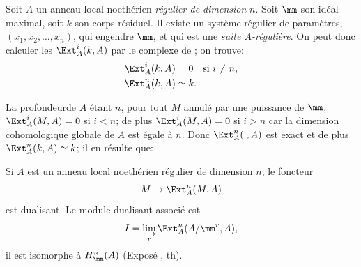 \begin{exemple} \label{IV.5.3}
Soit $A$ un anneau local noeth\'erien \emph{r\'egulier de dimension} $n$. Soit $\mm$ son id\'eal maximal, soit $k$ son corps r\'esiduel. Il existe un syst\`eme r\'egulier de param\`etres, $(x_{1}, x_{2}, \ldots, x_{n})$, qui engendre $\mm$, et qui est une \emph{suite $A$-r\'eguli\`ere}. On peut donc calculer les $\Ext^{i}_{A}(k, A)$ par le complexe de ; on trouve:
\begin{align*}
\Ext^{i}_{A}(k, A)&=0\quad \text{si } i\neq n,\\
\Ext^{n}_{A}(k, A)&\simeq k.
\end{align*}

La profondeur\pageoriginale de $A$ \'etant $n$, pour tout $M$ annul\'e par une puissance de $\mm$, $\Ext^{i}_{A}(M, A)=0$ si $i<n$; de plus $\Ext^{i}_{A}(M, A)=0$ si $i>n$ car la dimension cohomologique globale de $A$ est \'egale \`a $n$. Donc $\Ext^{n}_{A}(\;, A)$ est exact et de plus $\Ext^{n}_{A}(k, A)\simeq k$; il en r\'esulte que:
\end{exemple}

\begin{proposition} \label{IV.5.4}
Si $A$ est un anneau local noeth\'erien r\'egulier de dimension $n$, le foncteur
$$
M\to \Ext_{A}^{n}(M, A)
$$
est dualisant. Le module dualisant associ\'e est
$$
I=\varinjlim_{r}\Ext_{A}^{n}(A/\mm^{r}, A),
$$
il est isomorphe \`a $H^{n}_{\mm}(A)$ (Expos\'e , th\ptbl {}).
\end{proposition}

